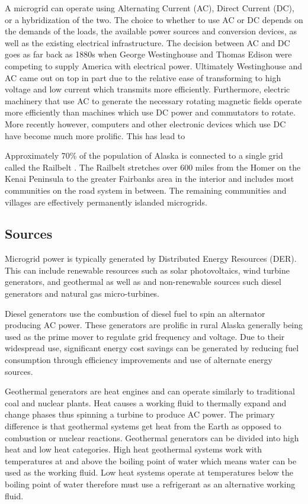 A microgrid can operate using Alternating Current (AC), Direct Current (DC), or a hybridization of the two. The choice to whether to use AC or DC depends on the demands of the loads, the available power sources and conversion devices, as well as the existing electrical infrastructure. The decision between AC and DC goes as far back as 1880s when George Westinghouse and Thomas Edison were competing to supply America with electrical power. Ultimately Westinghouse and AC came out on top in part due to the relative ease of transforming to high voltage and low current which transmits more efficiently. Furthermore, electric machinery that use AC to generate the necessary rotating magnetic fields operate more efficiently than machines which use DC power and commutators to rotate. More recently however, computers and other electronic devices which use DC have become much more prolific. This has lead to 

Approximately 70\% of the population of Alaska is connected to a single grid called the Railbelt \cite{railbelt}. The Railbelt stretches over 600 miles from the Homer on the Kenai Peninsula to the greater Fairbanks area in the interior and includes most communities on the road system in between. The remaining communities and villages are effectively permanently islanded microgrids. 

\subsection{Sources}
Microgrid power is typically generated by Distributed Energy Resources (DER). This can include renewable resources such as solar photovoltaics, wind turbine generators, and geothermal as well as and non-renewable sources such diesel generators and natural gas micro-turbines. 

Diesel generators use the combustion of diesel fuel to spin an alternator producing AC power. These generators are prolific in rural Alaska generally being used as the prime mover to regulate grid frequency and voltage. 
Due to their widespread use, significant energy cost savings can be generated by reducing fuel consumption through efficiency improvements and use of alternate energy sources.

Geothermal generators are heat engines and can operate similarly to traditional coal and nuclear plants. Heat causes a working fluid to thermally expand and change phases thus spinning a turbine to produce AC power. The primary difference is that geothermal systems get heat from the Earth as opposed to combustion or nuclear reactions. Geothermal generators can be divided into high heat and low heat categories. High heat geothermal systems work with temperatures at and above the boiling point of water which means water can be used as the working fluid. Low heat systems operate at temperatures below the boiling point of water therefore must use a refrigerant as an alternative working fluid. 

